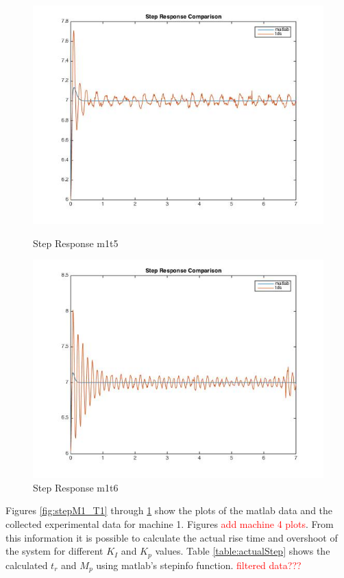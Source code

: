 \documentclass[11pt,titlepage]{article}
\begin{document}
    \begin{figure}[H]
        \centering
        \begin{minipage}{.5\textwidth}
            \centering
            \includegraphics[scale=.4]{stepM1_T5}
            \caption{Step Response m1t5}
            \label{fig:stepM1_T5}
        \end{minipage}%
        \begin{minipage}{.5\textwidth}
            \centering
            \includegraphics[scale=.4]{stepM1_T6}
            \caption{Step Response m1t6}
            \label{fig:stepM1_T6}
        \end{minipage}%
    \end{figure}
    \noindent Figures \ref{fig:stepM1_T1} through \ref{fig:stepM1_T6} show the plots of the matlab data and the collected experimental data for machine 1. Figures \textcolor{red}{add machine 4 plots}. From this information it is possible to calculate the actual rise time and overshoot of the system for different $K_I$ and $K_p$ values. Table \ref{table:actualStep} shows the calculated $t_r$ and $M_p$ using matlab's stepinfo function. \textcolor{red}{filtered data???}
\end{document}
